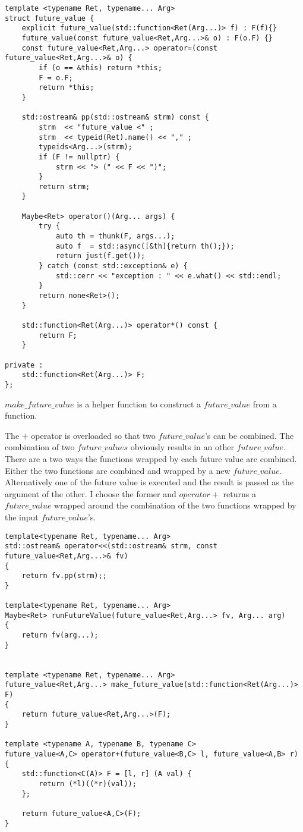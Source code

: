 \documentclass[12pt,fleqn]{article}
\begin{document}
\begin{minipage}{\linewidth}
\begin{lstlisting}[caption=Future value type class, label=fv]
template <typename Ret, typename... Arg>
struct future_value {
	explicit future_value(std::function<Ret(Arg...)> f) : F(f){}
	future_value(const future_value<Ret,Arg...>& o) : F(o.F) {}
	const future_value<Ret,Arg...> operator=(const future_value<Ret,Arg...>& o) {
		if (o == &this) return *this;
		F = o.F;
		return *this;
	}

	std::ostream& pp(std::ostream& strm) const {
		strm  << "future_value <" ;
		strm  << typeid(Ret).name() << "," ;
		typeids<Arg...>(strm);
		if (F != nullptr) {
			strm << "> (" << F << ")";
		}
		return strm;
	}

	Maybe<Ret> operator()(Arg... args) {
		try {
			auto th = thunk(F, args...);
			auto f  = std::async([&th]{return th();});
			return just(f.get());
		} catch (const std::exception& e) {
			std::cerr << "exception : " << e.what() << std::endl;
		}
		return none<Ret>();
	}

	std::function<Ret(Arg...)> operator*() const {
		return F;
	}

private :
	std::function<Ret(Arg...)> F;
};
\end{lstlisting}
\end{minipage}

$make\_future\_value$ is a helper function to construct a $future\_value$ from a function.

The $+$ operator is overloaded so that two $future\_value$'s can be combined.
The combination of two $future\_values$ obviously results in an other $future\_value$.
There are a two ways the functions wrapped by each future value are combined.
Either the two functions are combined and wrapped by a new $future\_value$.
Alternatively one of the future value is executed  and the result is passed as the argument of the other.
I choose the former and $operator+$ returns a $future\_value$ wrapped around the combination of the two functions wrapped by the input $future\_value$'s.

\begin{minipage}{\linewidth}
\begin{lstlisting}[caption=Future value type class auxilliary functions, label=fvaux]
template<typename Ret, typename... Arg>
std::ostream& operator<<(std::ostream& strm, const future_value<Ret,Arg...>& fv) 
{
	return fv.pp(strm);;
}

template<typename Ret, typename... Arg>
Maybe<Ret> runFutureValue(future_value<Ret,Arg...> fv, Arg... arg)
{
	return fv(arg...);
}


template <typename Ret, typename... Arg>
future_value<Ret,Arg...> make_future_value(std::function<Ret(Arg...)> F)
{
	return future_value<Ret,Arg...>(F);
}

template <typename A, typename B, typename C>
future_value<A,C> operator+(future_value<B,C> l, future_value<A,B> r)
{
	std::function<C(A)> F = [l, r] (A val) {
		return (*l)((*r)(val));
	};

	return future_value<A,C>(F);
}

\end{lstlisting}
\end{minipage}
%
%
%
\end{document}
